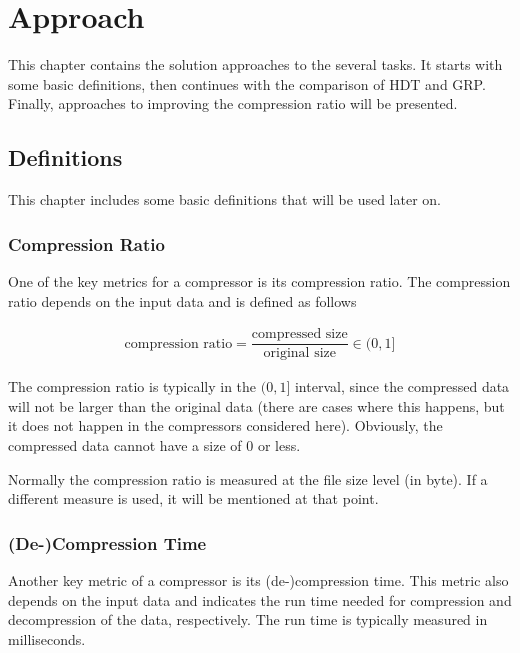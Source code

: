 \chapter{Approach}\label{ch:approach}

This chapter contains the solution approaches to the several tasks. It starts with some basic definitions, then continues with the comparison of HDT and GRP. Finally, approaches to improving the compression ratio will be presented.

\section{Definitions}\label{sec:definitions}

This chapter includes some basic definitions that will be used later on.

\subsection{Compression Ratio}

One of the key metrics for a compressor is its compression ratio. The compression ratio depends on the input data and is defined as follows

\begin{align*}
\text{compression ratio} = \dfrac{\text{compressed size}}{\text{original size}} \in (0,1]
\end{align*}

The compression ratio is typically in the $(0,1]$ interval, since the compressed data will not be larger than the original data (there are cases where this happens, but it does not happen in the compressors considered here). Obviously, the compressed data cannot have a size of 0 or less.

Normally the compression ratio is measured at the file size level (in byte). If a different measure is used, it will be mentioned at that point.

\subsection{(De-)Compression Time}

Another key metric of a compressor is its (de-)compression time. This metric also depends on the input data and indicates the run time needed for compression and decompression of the data, respectively. The run time is typically measured in milliseconds.

